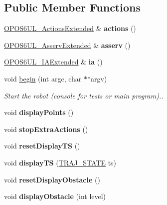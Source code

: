 \subsection*{Public Member Functions}
\begin{DoxyCompactItemize}
\item 
\mbox{\label{classOPOS6UL__RobotExtended_a6468a2bb1fc8de815154a322e038b875}} 
\hyperlink{classOPOS6UL__ActionsExtended}{O\+P\+O\+S6\+U\+L\+\_\+\+Actions\+Extended} \& {\bfseries actions} ()
\item 
\mbox{\label{classOPOS6UL__RobotExtended_a29465c04e6705292119510a57e18b138}} 
\hyperlink{classOPOS6UL__AsservExtended}{O\+P\+O\+S6\+U\+L\+\_\+\+Asserv\+Extended} \& {\bfseries asserv} ()
\item 
\mbox{\label{classOPOS6UL__RobotExtended_aece92ee3684b32eab5bbebba812e1c6b}} 
\hyperlink{classOPOS6UL__IAExtended}{O\+P\+O\+S6\+U\+L\+\_\+\+I\+A\+Extended} \& {\bfseries ia} ()
\item 
\mbox{\label{classOPOS6UL__RobotExtended_a3af6cff5115c7ae70f7a797d9e90e66a}} 
void \hyperlink{classOPOS6UL__RobotExtended_a3af6cff5115c7ae70f7a797d9e90e66a}{begin} (int argc, char $\ast$$\ast$argv)
\begin{DoxyCompactList}\small\item\em Start the robot (console for tests or main program).. \end{DoxyCompactList}\item 
\mbox{\label{classOPOS6UL__RobotExtended_a73821b0ec83f0ebcdccf8c9e999616a0}} 
void {\bfseries display\+Points} ()
\item 
\mbox{\label{classOPOS6UL__RobotExtended_a0a997f7fd88abac1efe0083fce633649}} 
void {\bfseries stop\+Extra\+Actions} ()
\item 
\mbox{\label{classOPOS6UL__RobotExtended_a5297c0c8c1c9b4f25effe72b71ace570}} 
void {\bfseries reset\+Display\+TS} ()
\item 
\mbox{\label{classOPOS6UL__RobotExtended_a4c7e16c32c1eaa463f577c100f63f618}} 
void {\bfseries display\+TS} (\hyperlink{path__manager_8h_adb3360abeb29758da93865c8afcb80eb}{T\+R\+A\+J\+\_\+\+S\+T\+A\+TE} ts)
\item 
\mbox{\label{classOPOS6UL__RobotExtended_a819ce5f4225f7082d6ce8cf19466dc33}} 
void {\bfseries reset\+Display\+Obstacle} ()
\item 
\mbox{\label{classOPOS6UL__RobotExtended_a9b3f31797fc1916741d6bc61eaf3d1b7}} 
void {\bfseries display\+Obstacle} (int level)
\end{DoxyCompactItemize}
